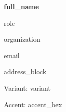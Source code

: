 \documentclass[9pt]{article}
\begin{document}
\raggedright
\textbf{\Large {{ full_name }}}\par
{{ role }}\par
{{ organization }}\par
{{ email }}\par
{{ address_block }}\par
Variant: {{ variant }}\par
Accent: {{ accent_hex }}\par
\cardiffqr[width=0.6in]
\end{document}
